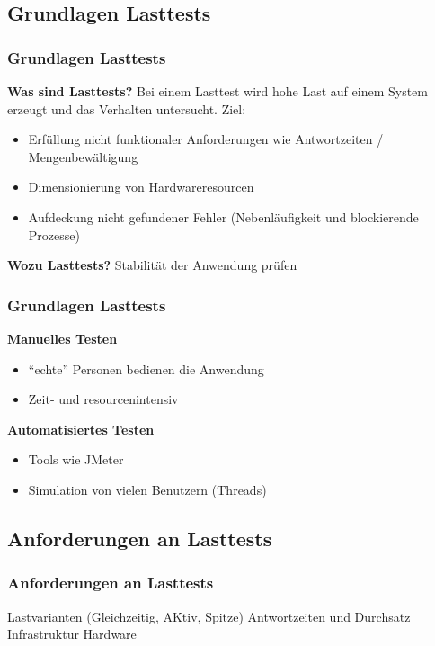 \documentclass[xcolor=dvipsnames]{beamer}
\begin{document}
\subsection{Grundlagen Lasttests}
\begin{frame}
\frametitle{Grundlagen Lasttests}
\textbf{Was sind Lasttests?}\newline
Bei einem Lasttest wird hohe Last auf einem System erzeugt und das Verhalten untersucht. Ziel:
\begin{itemize}
		\item Erfüllung nicht funktionaler Anforderungen wie Antwortzeiten / Mengenbewältigung
		\item Dimensionierung von Hardwareresourcen  	
		\item Aufdeckung nicht gefundener Fehler (Nebenläufigkeit und blockierende Prozesse)
\end{itemize}
\textbf{Wozu Lasttests?} \newline Stabilität der Anwendung prüfen
\end{frame}


\begin{frame}
\frametitle{Grundlagen Lasttests}

\textbf{Manuelles Testen}
\begin{itemize}
\item "`echte"' Personen bedienen die Anwendung
\item Zeit- und resourcenintensiv \newline
{}
\end{itemize}

\textbf{Automatisiertes Testen}
\begin{itemize}
\item Tools wie JMeter
\item Simulation von vielen Benutzern (Threads)
\end{itemize}
\end{frame}

\subsection{Anforderungen an Lasttests}
\begin{frame}
\frametitle{Anforderungen an Lasttests}
Lastvarianten (Gleichzeitig, AKtiv, Spitze)
Antwortzeiten und Durchsatz
Infrastruktur Hardware
\end{frame}
\end{document}
